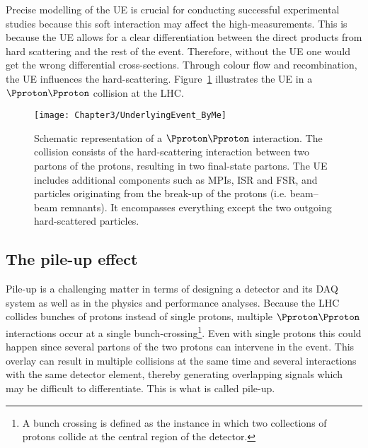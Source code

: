 Precise modelling of the UE is crucial for conducting successful experimental studies because
this soft interaction may affect the high-\pT measurements.
This is because the UE allows for a clear differentiation between the direct products 
from hard scattering and the rest of the event. 
Therefore, without the UE one would get the wrong differential cross-sections.
Through colour flow and recombination, the UE influences the hard-scattering.
Figure~\ref{fig:Chap2:UnderlyingEvent}
illustrates the UE in a $\Pproton \Pproton$ collision at the LHC.


\begin{figure}[h]
 	  \centering
	\texttt{[image: Chapter3/UnderlyingEvent\_ByMe]}
	\caption{Schematic representation of a $\Pproton\Pproton$ interaction.
	The collision consists of the hard-scattering interaction between two partons of the protons, 
	resulting in two final-state partons. 
	The UE includes additional components such as MPIs, ISR and FSR, 
	and particles originating from the break-up of the protons (i.e. beam--beam remnants). 
	It encompasses everything except the two outgoing hard-scattered particles.} 
	\label{fig:Chap2:UnderlyingEvent}
\end{figure}




\subsection{The pile-up effect} 
\label{sec:Chap2:LHC:pileup}

Pile-up is a challenging matter in terms of designing a detector and its DAQ system
as well as in the physics and performance analyses.
Because the LHC collides bunches of protons instead of single protons, multiple 
$\Pproton \Pproton$ interactions
occur at a single bunch-crossing\footnote{A bunch crossing is defined as the instance in which two 
collections of protons collide at the central region of the detector.}. Even with single protons this 
could happen since several partons of the two protons can intervene in the event.
This overlay can result in multiple collisions
at the same time and several interactions
with the same detector element, thereby generating overlapping signals which may be difficult
to differentiate. This is what is called pile-up.

